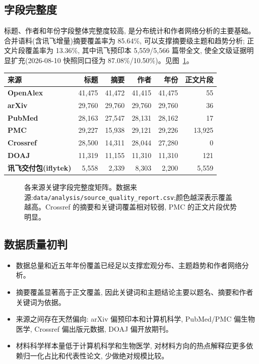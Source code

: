 \subsection{字段完整度}

标题、作者和年份字段整体完整度较高, 是分布统计和作者网络分析的主要基础。合并语料(含讯飞增量)摘要覆盖率为 85.64\%, 可以支撑摘要级主题和趋势分析; 正文片段覆盖率为 13.36\%, 其中讯飞预印本 5,559/5,566 篇带全文, 使全文级证据明显扩充(2026-08-10 快照同口径为 87.08\%/10.50\%)。见图~\ref{fig:data-field-readiness}。

\begin{tableblock}
\begin{tabularx}{\textwidth}{>{\bfseries}p{28mm}rrrrr}
\toprule
来源 & 标题 & 摘要 & 作者 & 年份 & 正文片段 \\
\midrule
OpenAlex & 41,475 & 41,472 & 41,415 & 41,475 & 55 \\
arXiv & 29,760 & 29,760 & 29,760 & 29,760 & 36 \\
PubMed & 28,163 & 27,547 & 28,131 & 28,162 & 17 \\
PMC & 29,227 & 15,938 & 29,121 & 29,226 & 13,925 \\
Crossref & 28,500 & 14,311 & 28,044 & 27,280 & 0 \\
DOAJ & 11,319 & 11,155 & 11,310 & 11,310 & 121 \\
讯飞交付包(iflytek) & 5,558 & 2,339 & 8,303 & 2,200 & 5,559 \\
\bottomrule
\end{tabularx}
\end{tableblock}

\begin{figure}[!htbp]
  \centering
  \caption{各来源关键字段完整度矩阵。数据来源:\texttt{data/analysis/source\_quality\_report.csv};颜色越深表示覆盖越高。Crossref 的摘要和关键词覆盖相对较弱, PMC 的正文片段优势明显。}
  \label{fig:data-field-readiness}
\end{figure}

\subsection{数据质量初判}

\begin{itemize}
  \item 数据总量和近五年年份覆盖已经足以支撑宏观分布、主题趋势和作者网络分析。
  \item 摘要覆盖显著高于正文覆盖, 因此关键词和主题结论主要以题名、摘要和作者关键词为依据。
  \item 来源之间存在天然偏向: arXiv 偏预印本和计算机科学, PubMed/PMC 偏生物医学, Crossref 偏出版元数据, DOAJ 偏开放期刊。
  \item 材料科学样本量低于计算机科学和生物医学, 对材料方向的热点解释应更多依赖归一化占比和代表性论文, 少做绝对规模比较。
\end{itemize}

\clearpage
